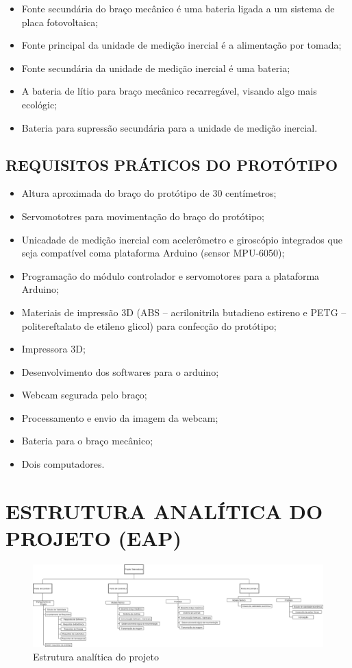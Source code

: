 \begin{itemize}
\item Fonte secundária do braço mecânico é uma bateria ligada a um sistema de placa fotovoltaica;
\item Fonte principal da unidade de medição inercial é a alimentação por tomada;
\item Fonte secundária da unidade de medição inercial é uma bateria;
\item A bateria de lítio para braço mecânico recarregável, visando algo mais ecológic; 
\item Bateria para supressão secundária para a unidade de medição inercial.
\end{itemize}

\subsection{REQUISITOS PRÁTICOS DO PROTÓTIPO}

\begin{itemize}
\item Altura aproximada do braço do protótipo de 30 centímetros;
\item Servomototres para movimentação do braço do protótipo;
\item Unicadade de medição inercial com acelerômetro e giroscópio integrados que seja compatível coma plataforma Arduino (sensor MPU-6050);
\item Programação do módulo controlador e servomotores para a plataforma Arduino;
\item Materiais de impressão 3D (ABS – acrilonitrila butadieno estireno e PETG – politereftalato de etileno glicol) para confecção do protótipo;
\item Impressora 3D;
\item Desenvolvimento dos softwares para o arduino;
\item Webcam segurada pelo braço;
\item Processamento e envio da imagem da webcam;
\item Bateria para o braço mecânico;
\item Dois computadores.
\end{itemize}

\section{ESTRUTURA ANALÍTICA DO PROJETO (EAP)}

\begin{figure}[h]
	\centering
	\includegraphics[keepaspectratio=true,scale=0.21]{figuras/eap_pi1.png}
	\caption{Estrutura analítica do projeto}
	\label{eap_fig01}
\end{figure}

